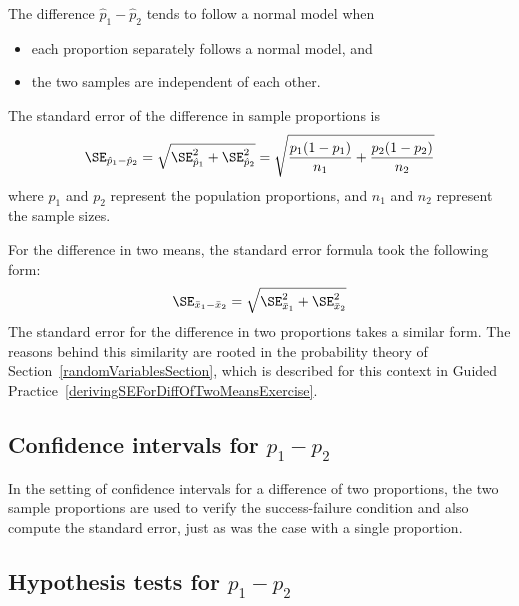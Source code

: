 \begin{termBox}{
	The difference $\hat{p}_1 - \hat{p}_2$ tends to follow a normal model when
	\begin{itemize}
		\setlength{\itemsep}{0mm}
		\item each proportion separately follows a normal model, and
		\item the two samples are independent of each other.
	\end{itemize}
	The standard error of the difference in sample proportions is
	\begin{eqnarray}
		\SE_{\hat{p}_1 - \hat{p}_2}
			= \sqrt{\SE_{\hat{p}_1}^2 + \SE_{\hat{p}_2}^2}
			= \sqrt{\frac{p_1(1-p_1)}{n_1} + \frac{p_2(1-p_2)}{n_2}}
			\label{seForDiffOfProp}
	\end{eqnarray}
	where $p_1$ and $p_2$ represent the population proportions, and $n_1$ and $n_2$ represent the sample sizes.}
\end{termBox}

For the difference in two means, the standard error formula took the following form:
\begin{eqnarray*}
\SE_{\bar{x}_{1} - \bar{x}_{2}} = \sqrt{\SE_{\bar{x}_1}^2 + \SE_{\bar{x}_2}^2}
\end{eqnarray*}
The standard error for the difference in two proportions takes a similar form. The reasons behind this similarity are rooted in the probability theory of Section~\ref{randomVariablesSection}, which is described for this context in Guided Practice~\vref{derivingSEForDiffOfTwoMeansExercise}.


\subsection{Confidence intervals for $p_1 -p_2$}

In the setting of confidence intervals for a difference of two proportions, the two sample proportions are used to verify the success-failure condition and also compute the standard error, just as was the case with a single proportion.



\subsection{Hypothesis tests for $p_1 -p_2$}


